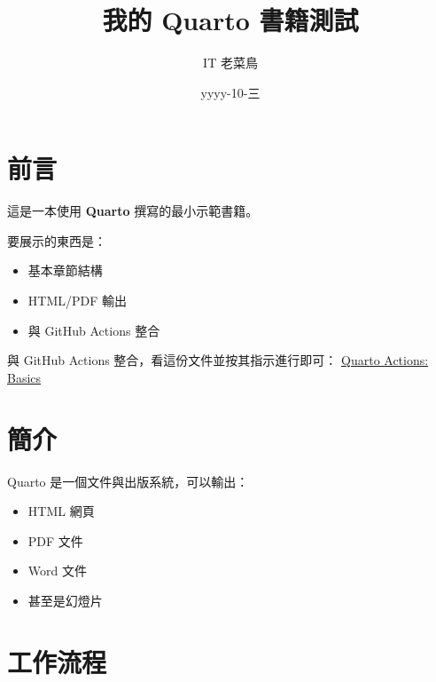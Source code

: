 \documentclass[
  chinese,
  11pt,
  a4paper,
]{book}
\title{我的 Quarto 書籍測試}
\author{IT 老菜鳥}
\date{yyyy-10-三}
\providecommand{\tightlist}{%
  \setlength{\itemsep}{0pt}\setlength{\parskip}{0pt}}
\renewcommand*\contentsname{目錄}
\newcommand\contentsname{目錄}
\begin{document}
\frontmatter
\maketitle

\renewcommand*\contentsname{目錄}
{
\setcounter{tocdepth}{2}
\tableofcontents
}

\mainmatter
{}

\chapter*{前言}\label{ux524dux8a00}


這是一本使用 \textbf{Quarto} 撰寫的最小示範書籍。

要展示的東西是：

\begin{itemize}
\tightlist
\item
  基本章節結構
\item
  HTML/PDF 輸出
\item
  與 GitHub Actions 整合
\end{itemize}

與 GitHub Actions 整合，看這份文件並按其指示進行即可：
\href{https://github.com/quarto-dev/quarto-actions/blob/main/examples/example-01-basics.md}{Quarto
Actions: Basics}


\chapter{簡介}\label{ux7c21ux4ecb}

Quarto 是一個文件與出版系統，可以輸出：

\begin{itemize}
\tightlist
\item
  HTML 網頁
\item
  PDF 文件
\item
  Word 文件
\item
  甚至是幻燈片
\end{itemize}


\chapter{工作流程}\label{ux5de5ux4f5cux6d41ux7a0b}
\end{document}
